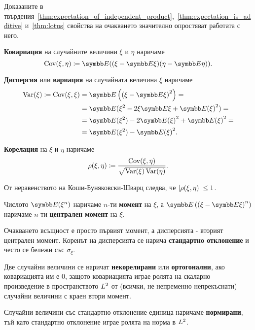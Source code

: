 \documentclass[numbers=endperiod, bibliography=totocnumbered]{scrartcl}
\begin{document}
Доказаните в твърдения~\ref{thm:expectation_of_independent_product},~\ref{thm:expectation_is_additive} и~\ref{thm:lotus} свойства на очакването значително опростяват работата с него.

\begin{definition}
  \textbf{Ковариация} на случайните величини \( \xi \) и \( \eta \) наричаме
  \begin{equation*}
    \Cov(\xi, \eta)
    \coloneqq
    \Expect((\xi - \Expect \xi) (\eta - \Expect \eta)).
  \end{equation*}

  \textbf{Дисперсия} или \textbf{вариация} на случайната величина \( \xi \) наричаме
  \begin{align*}
    \Var(\xi)
    \coloneqq
    \Cov(\xi, \xi)
    &=
    \Expect \left({(\xi - \Expect \xi)}^2 \right)
    = \\ &=
    \Expect(\xi^2 - 2 \xi \Expect \xi + {\Expect(\xi)}^2)
    = \\ &=
    \Expect(\xi^2) - 2 {\Expect(\xi)}^2 + {\Expect(\xi)}^2
    = \\ &=
    \Expect(\xi^2) - {\Expect(\xi)}^2.
  \end{align*}

  \textbf{Корелация} на \( \xi \) и \( \eta \) наричаме
  \begin{equation*}
    \operatorname{\rho}(\xi, \eta)
    \coloneqq
    \frac {\operatorname{Cov}(\xi, \eta)} {\sqrt{\operatorname{Var}(\xi) \operatorname{Var}(\eta)}}.
  \end{equation*}

  От неравенството на Коши-Буняковски-Шварц следва, че \( \left\vert \operatorname{\rho}(\xi, \eta) \right\vert \leq 1 \).

  Числото \( \Expect(\xi^n) \) наричаме \( n \)-ти \textbf{момент} на \( \xi \), а \( \Expect \left( {(\xi - \Expect \xi)}^n \right) \) наричаме \( n \)-ти \textbf{централен момент} на \( \xi \).

  Очакването всъщност е просто първият момент, а дисперсията - вторият централен момент. Коренът на дисперсията се нарича \textbf{стандартно отклонение} и често се бележи със \( \sigma_\xi \).

  Две случайни величини се наричат \textbf{некорелирани} или \textbf{ортогонални}, ако ковариацията им е \( 0 \), защото ковариацията играе ролята на скаларно произведение в пространството \( L^2 \) от (всички, не непременно непрекъснати) случайни величини с краен втори момент.

  Случайни величини със стандартно отклонение единица наричаме \textbf{нормирани}, тъй като стандартно отклонение играе ролята на норма в \( L^2 \).
\end{definition}
\end{document}
